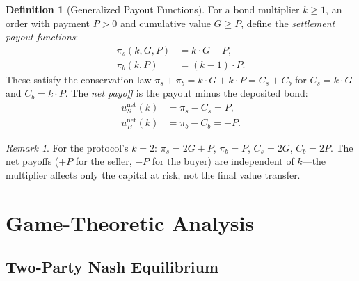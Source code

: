 \documentclass[11pt,a4paper]{article}
\theoremstyle{definition}
\newtheorem{definition}[theorem]{Definition}
\theoremstyle{remark}
\newtheorem{remark}[theorem]{Remark}
\newcommand{\pay}{P}           %
\newcommand{\cumval}{G}        %
\newcommand{\sbond}{C_s}       %
\newcommand{\bbond}{C_b}       %
\newcommand{\spay}{\pi_s}      %
\newcommand{\bpay}{\pi_b}      %
\newcommand{\ub}{u_B}          %
\newcommand{\us}{u_S}          %
\begin{document}
\begin{definition}[Generalized Payout Functions]
\label{def:payout-functions}
For a bond multiplier $k \geq 1$, an order with payment $\pay > 0$
and cumulative value $\cumval \geq \pay$, define the
\emph{settlement payout functions}:
\begin{align}
  \spay(k, \cumval, \pay) &= k \cdot \cumval + \pay,
    \label{eq:general-seller-payout} \\
  \bpay(k, \pay) &= (k - 1) \cdot \pay.
    \label{eq:general-buyer-payout}
\end{align}
These satisfy the conservation law
$\spay + \bpay = k \cdot \cumval + k \cdot \pay = \sbond + \bbond$
for $\sbond = k \cdot \cumval$ and $\bbond = k \cdot \pay$. The
\emph{net payoff} is the payout minus the deposited bond:
\begin{align}
  \us^{\text{net}}(k) &= \spay - \sbond = \pay,
    \label{eq:seller-net} \\
  \ub^{\text{net}}(k) &= \bpay - \bbond = -\pay.
    \label{eq:buyer-net}
\end{align}
\end{definition}

\begin{remark}
For the protocol's $k = 2$: $\spay = 2\cumval + \pay$,
$\bpay = \pay$, $\sbond = 2\cumval$, $\bbond = 2\pay$. The
net payoffs ($+\pay$ for the seller, $-\pay$ for the buyer) are
independent of $k$---the multiplier affects only the capital at risk,
not the final value transfer.
\end{remark}

\section{Game-Theoretic Analysis}
\label{sec:game-theory}

\subsection{Two-Party Nash Equilibrium}
\end{document}
